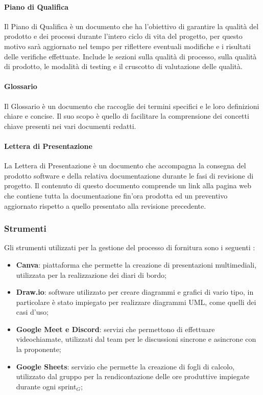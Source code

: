     \paragraph{Piano di Qualifica}
    Il Piano di Qualifica è un documento che ha l'obiettivo di garantire la qualità del prodotto e dei processi durante l'intero ciclo di vita del progetto, per questo motivo sarà aggiornato nel tempo per riflettere eventuali modifiche e i risultati delle verifiche effettuate. Include le sezioni sulla qualità di processo, sulla qualità di prodotto, le modalità di testing e il cruscotto di valutazione delle qualità.\\

    \paragraph{Glossario}
    Il Glossario è un documento che raccoglie dei termini specifici e le loro definizioni chiare e concise. Il suo scopo è quello di facilitare la comprensione dei concetti chiave presenti nei vari documenti redatti.\\

    \paragraph{Lettera di Presentazione}
    La Lettera di Presentazione è un documento che accompagna la consegna del prodotto software e della relativa documentazione durante le fasi di revisione di progetto. Il contenuto di questo documento comprende un link alla pagina web che contiene tutta la documentazione fin'ora prodotta ed un preventivo aggiornato rispetto a quello presentato alla revisione precedente.\\

\subsubsection{Strumenti}
 Gli strumenti utilizzati per la gestione del processo di fornitura sono i seguenti :
 \begin{itemize}
    \item \textbf{Canva}: piattaforma che permette la creazione di presentazioni multimediali, utilizzata per la realizzazione dei diari di bordo;
    \item \textbf{Draw.io}: software utilizzato per creare diagrammi e grafici di vario tipo, in particolare è stato impiegato per realizzare diagrammi UML, come quelli dei casi d’uso;
    \item \textbf{Google Meet e Discord}: servizi che permettono di effettuare videochiamate, utilizzati dal team per le discussioni sincrone e asincrone con la proponente;
    \item \textbf{Google Sheets}: servizio che permette la creazione di fogli di calcolo, utilizzato dal gruppo per la rendicontazione delle ore produttive impiegate durante ogni sprint$_G$;
 \end{itemize}